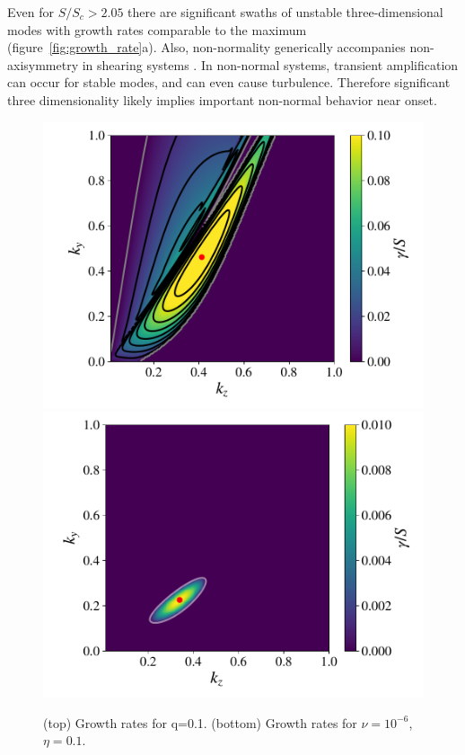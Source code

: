 \documentclass[aps,prl,reprint,superscriptaddress]{revtex4-1}
\newcommand{\SSC}{S/S_{c}}
\begin{document}
Even for $\SSC> 2.05$ there are significant swaths of unstable three-dimensional modes with growth rates comparable to the maximum (figure~\ref{fig:growth_rate}a).
Also, non-normality generically accompanies non-axisymmetry in shearing systems \citep[see][for a discussion relevant to the MRI]{1992MNRAS.255P..25K}.
In non-normal systems, transient amplification can occur for stable modes, and can even cause turbulence.
Therefore significant three dimensionality likely implies important non-normal behavior near onset.

\begin{figure}[h!]
  \centering
  \includegraphics[width=\columnwidth]{run_47_output_growthrates.pdf}\\
  \includegraphics[width=\columnwidth]{run_49_output_growthrates.pdf}
  \caption{(top) Growth rates for q=0.1. (bottom) Growth rates for $\nu=10^{-6}$, $\eta = 0.1$.}
  \label{fig:other_params}
\end{figure}
\end{document}
